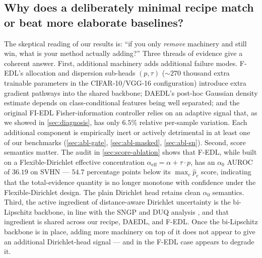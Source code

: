 \documentclass[review,5p,times]{elsarticle}
\begin{document}
\subsection{Why does a deliberately minimal recipe match or beat more
elaborate baselines?}\label{sec:disc-why}
The skeptical reading of our results is: ``if you only \emph{remove}
machinery and still win, what is your method actually adding?'' Three
threads of evidence give a coherent answer. First, additional machinery
adds additional failure modes. F-EDL's allocation and dispersion
sub-heads $(p,\tau)$ ($\sim\!270$ thousand extra trainable parameters in
the CIFAR-10/VGG-16 configuration) introduce extra gradient pathways
into the shared backbone; DAEDL's post-hoc Gaussian density estimate
depends on class-conditional features being well separated; and the
original FI-EDL Fisher-information controller relies on an adaptive
signal that, as we showed in \autoref{sec:diagnosis}, has only
$6.5\%$ relative per-sample variation. Each additional component is
empirically inert or actively detrimental in at least one of our
benchmarks (\autoref{sec:abl-gate}, \autoref{sec:abl-masked},
\autoref{sec:abl-sn}). Second, score semantics matter. The audit in
\autoref{sec:score-ablation} shows that F-EDL, while built on a
Flexible-Dirichlet effective concentration
$\alpha_{\text{eff}}\!=\!\alpha\!+\!\tau\!\cdot\!p$, has an $\alpha_0$
AUROC of $36.19$ on SVHN --- $54.7$ percentage points below its
$\max_c\hat p_c$ score, indicating that the total-evidence quantity is
no longer monotone with confidence under the Flexible-Dirichlet design.
The plain Dirichlet head retains clean $\alpha_0$ semantics. Third, the
active ingredient of distance-aware Dirichlet uncertainty is the
bi-Lipschitz backbone, in line with the SNGP and DUQ analysis
\citep{liu2020sngp,vanamersfoort2020duq}, and that ingredient is shared
across our recipe, DAEDL, and F-EDL. Once the bi-Lipschitz backbone is
in place, adding more machinery on top of it does not appear to give an
additional Dirichlet-head signal --- and in the F-EDL case appears to
degrade it.
\end{document}
